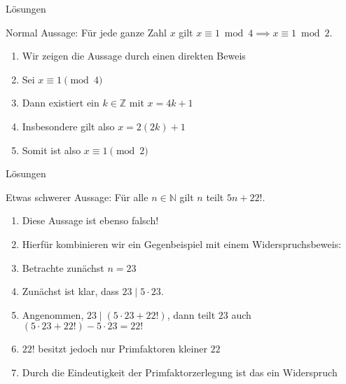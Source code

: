 {
\begin{frame}[fragile]{Lösungen}   
    \begin{block}{Normal}
        Aussage: Für jede ganze Zahl $x$ gilt $x\equiv 1\bmod 4 \implies x\equiv 1\bmod 2$.
        \begin{enumerate}
            \item<2-> Wir zeigen die Aussage durch einen direkten Beweis 
            \item<3-> Sei $x \equiv 1 \pmod{4}$
            \item<4-> Dann existiert ein $k \in \mathbb{Z}$ mit $x = 4k + 1$
            \item<5-> Insbesondere gilt also $x = 2(2k)+1$
            \item<6-> Somit ist also $x \equiv 1 \pmod{2}$
        \end{enumerate}
    \end{block}
\end{frame}
}

{
\begin{frame}[fragile]{Lösungen}   
    \begin{block}{Etwas schwerer}
        Aussage: Für alle $n \in \mathbb{N}$ gilt $n$ teilt $5n + 22!$.
        \begin{enumerate}
            \item<2-> Diese Aussage ist ebenso falsch!
            \item<3-> Hierfür kombinieren wir ein Gegenbeispiel mit einem Widerspruchsbeweis:
            \item<4-> Betrachte zunächst $n = 23$
            \item<5-> Zunächst ist klar, dass $23 \mid 5\cdot23$.
            \item<6-> Angenommen, $23 \mid (5\cdot23 + 22!)$, dann teilt $23$ auch $(5\cdot23+22!)-5\cdot23 = 22!$
            \item<7-> $22!$ besitzt jedoch nur Primfaktoren kleiner $22$
            \item<8-> Durch die Eindeutigkeit der Primfaktorzerlegung ist das ein Widerspruch
        \end{enumerate}
    \end{block}
\end{frame}
}


